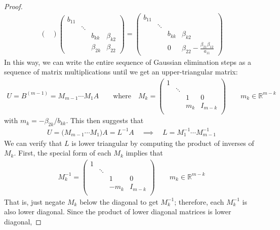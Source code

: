 \documentclass[12pt]{book}
\numberwithin{equation}{section} %
\theoremstyle{plain}
\theoremstyle{definition}
\theoremstyle{remark}
\newcommand{\R}{\mathbb{R}}
\begin{document}
\begin{proof}
\begin{align*}
\begin{pmatrix}
  \end{pmatrix}
  \begin{pmatrix}
    b_{11} & \\
    & \ddots &  & \\
    & & b_{kk} & \beta_{k2} \\
    & & \beta_{2k} & \beta_{22}
  \end{pmatrix}
  =
  \begin{pmatrix}
    b_{11} & \\
    & \ddots &  & \\
    & & b_{kk} & \beta_{k2}  \\
    & & 0 & \beta_{22}
      - \frac{\beta_{21}\beta_{12}}{a_{11}}
  \end{pmatrix}
\end{align*}
In this way, we can write the entire sequence of Gaussian elimination
steps as a sequence of matrix multiplications until we get an
upper-triangular matrix:
\begin{align*}
  U = B^{(m-1)} = M_{m-1}\cdots M_1 A
  \qquad
  \text{where}\quad
  M_k
  =
  \begin{pmatrix}
    1 & &\\
    & \ddots &\\
    & & 1 & 0\\
    & & m_k & I_{m-k} \\
  \end{pmatrix}
  \qquad m_k \in\R^{m-k}
\end{align*}
with $m_k = -\beta_{2k}/b_{kk}$.
This then suggests that
\begin{align*}
  U = \big(M_{m-1}\cdots M_1\big)A
  = L^{-1} A
  \quad\implies\quad
  L = M_1^{-1}\cdots M_{m-1}^{-1}
\end{align*}
We can verify that $L$ is lower triangular by computing the product of
inverses of $M_k$. First, the special form of each $M_k$ implies that
\begin{align*}
  M_k^{-1} =
  \begin{pmatrix}
    1 & &\\
    & \ddots &\\
    & & 1 & 0\\
    & & -m_k &I_{m-k} \\
  \end{pmatrix}
  \qquad m_k \in\R^{m-k}
\end{align*}
That is, just negate $M_k$ below the diagonal to get $M_{k}^{-1}$;
therefore, each $M_k^{-1}$ is also lower diagonal. Since the product of
lower diagonal matrices is lower diagonal,

\end{proof}
\end{document}
